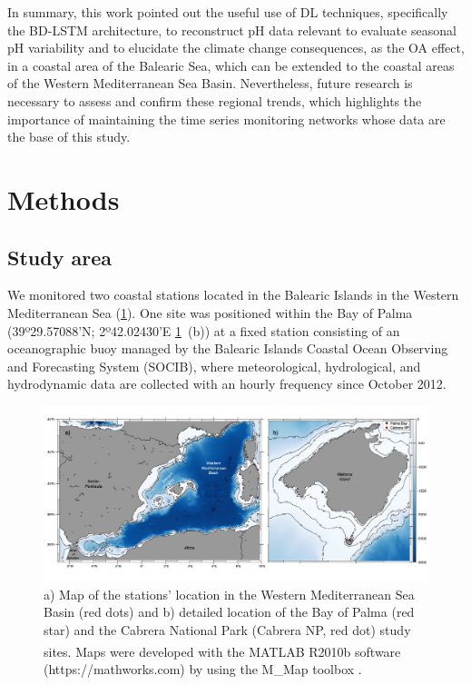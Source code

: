 In summary, this work pointed out the useful use of DL techniques,
specifically the BD-LSTM architecture, to reconstruct pH data relevant to
evaluate seasonal pH variability and to elucidate the climate change
consequences, as the OA effect, in a coastal area of the Balearic Sea, which
can be extended to the coastal areas of the Western Mediterranean Sea Basin.
Nevertheless, future research is necessary to assess and confirm these regional
trends, which highlights the importance of maintaining the time series
monitoring networks whose data are the base of this study.

\section{Methods}
\subsection*{Study area}
We monitored two coastal stations located in the Balearic Islands in the
Western Mediterranean Sea (\cref{fig:1}). One site was positioned within the
Bay of Palma (39º29.57088’N; 2º42.02430’E
\cref{fig:1}~\textcolor{ref_color}{(b)}) at a fixed station consisting of an
oceanographic buoy managed by the Balearic Islands Coastal Ocean Observing and
Forecasting System (SOCIB), where meteorological, hydrological, and
hydrodynamic
data are collected with an hourly frequency since October 2012.

\begin{figure}[H]
    \centering
    \includegraphics[width=\textwidth]{Figures/Fig_1.jpg}
    \caption[Map of the stations' location in the Western Mediterranean Sea
        Basin]{a) Map of the stations' location in the Western Mediterranean
        Sea Basin (red dots) and b) detailed location of the Bay of Palma (red
        star) and the Cabrera National Park (Cabrera NP, red dot) study sites.
        Maps were developed with the MATLAB\textsuperscript{\textregistered}
        R2010b software (https://mathworks.com) by using the M\_Map
        toolbox \cite{pawlowicz2020m_map}.}
    \label{fig:1}
\end{figure}

